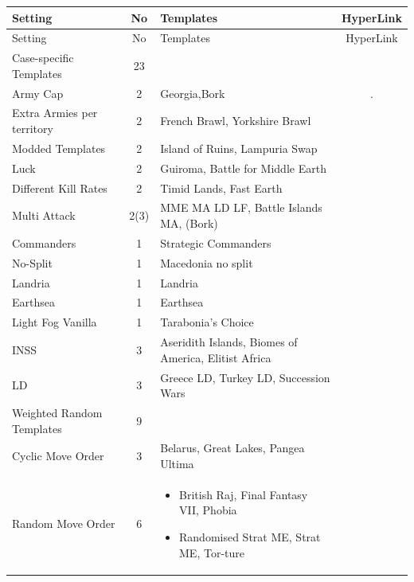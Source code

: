 \scriptsize
\begin{longtable}{|l|c|l|c|}
\hline
\rowcolor{Baby_Blue}
Setting & No & Templates & HyperLink \\ 
\hline
\hline
\endfirsthead
\hline
\rowcolor{Baby_Blue}
Setting & No & Templates & HyperLink \\ 
\hline
\hline
\endhead

\rowcolor{Light_Blue}
Case-specific Templates & 23 & & \\ \hline
Army Cap & 2 & Georgia,Bork & . \\ \hline
Extra Armies per territory & 2 & French Brawl, Yorkshire Brawl & \\ \hline
Modded Templates & 2 & Island of Ruins, Lampuria Swap & \\ \hline
Luck & 2 & Guiroma, Battle for Middle Earth & \\ \hline
Different Kill Rates & 2 & Timid Lands, Fast Earth & \\ \hline
Multi Attack & 2(3) & MME MA LD LF, Battle Islands MA, (Bork) & \\ \hline
Commanders & 1 & Strategic Commanders & \\ \hline
No-Split & 1 & Macedonia no split & \\ \hline
Landria & 1 & Landria & \\ \hline
Earthsea & 1 & Earthsea & \\ \hline
Light Fog Vanilla & 1 & Tarabonia's Choice & \\ \hline
INSS & 3 & Aseridith Islands, Biomes of America, Elitist Africa & \\ \hline
LD & 3 & Greece LD, Turkey LD, Succession Wars & \\ \hline

\rowcolor{Light_Blue}
Weighted Random Templates & 9 & & \\ \hline
Cyclic Move Order & 3 & Belarus, Great Lakes, Pangea Ultima & \\ \hline
Random Move Order & 6 & \begin{minipage}[t]{6cm} \begin{itemize} \item British Raj, Final Fantasy VII, Phobia \item Randomised Strat ME, Strat ME, Tor-ture \end{itemize} \vspace{-5pt} \end{minipage} & \\ \hline


\end{longtable}
